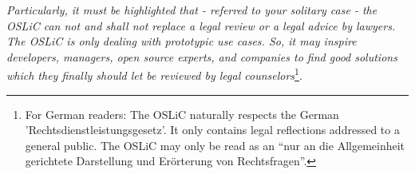 \textit{Particularly, it must be highlighted that - referred to your solitary
case - the OSLiC can not and shall not replace a legal review or a legal advice
by lawyers. The OSLiC is only dealing with prototypic use cases. So, it may
inspire developers, managers, open source experts, and companies to find good
solutions which they finally should let be reviewed by legal
counselors}\footnote{For German readers: The OSLiC naturally respects the German
'Rechtsdienstleistungsgesetz'. It only contains legal reflections addressed to a
general public. The OSLiC may only be read as an \enquote{nur an die
Allgemeinheit gerichtete Darstellung und Erörterung von Rechtsfragen}.}.



